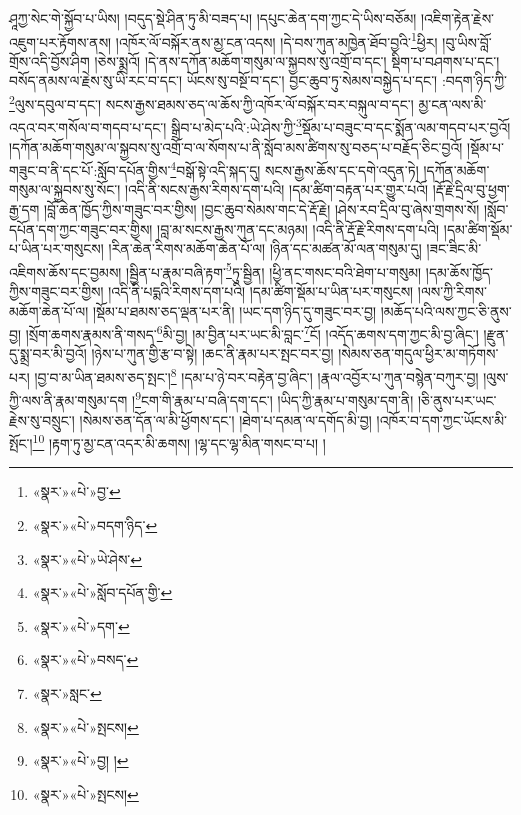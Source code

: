 ཤཱཀྱ་སེང་གེ་སྐྱོབ་པ་ཡིས། །བདུད་སྡེ་ཤིན་ཏུ་མི་བཟད་པ། །དཔུང་ཆེན་དག་ཀྱང་དེ་ཡིས་བཅོམ། །འཇིག་རྟེན་རྗེས་འཇུག་པར་རྟོགས་ནས། །འཁོར་ལོ་བསྐོར་ནས་མྱ་ངན་འདས། །དེ་བས་ཀུན་མཁྱེན་ཐོབ་བྱའི་\footnote{«སྣར་»«པེ་»བྱ་}ཕྱིར། །བུ་ཡིས་བློ་གྲོས་འདི་བྱོས་ཤིག །ཅེས་སྨྲའོ། །དེ་ནས་དཀོན་མཆོག་གསུམ་ལ་སྐྱབས་སུ་འགྲོ་བ་དང་། སྡིག་པ་བཤགས་པ་དང་། བསོད་ནམས་ལ་རྗེས་སུ་ཡི་རང་བ་དང་། ཡོངས་སུ་བསྔོ་བ་དང་། བྱང་ཆུབ་ཏུ་སེམས་བསྐྱེད་པ་དང་། :བདག་ཉིད་ཀྱི་\footnote{«སྣར་»«པེ་»བདག་ཉིད་}ལུས་དབུལ་བ་དང་། སངས་རྒྱས་ཐམས་ཅད་ལ་ཆོས་ཀྱི་འཁོར་ལོ་བསྐོར་བར་བསྐུལ་བ་དང་། མྱ་ངན་ལས་མི་འདའ་བར་གསོལ་བ་གདབ་པ་དང་། སྒྲིབ་པ་མེད་པའི་:ཡེ་ཤེས་ཀྱི་\footnote{«སྣར་»«པེ་»ཡེ་ཤེས་}སྡོམ་པ་བཟུང་བ་དང་སྨོན་ལམ་གདབ་པར་བྱའོ། །དཀོན་མཆོག་གསུམ་ལ་སྐྱབས་སུ་འགྲོ་བ་ལ་སོགས་པ་ནི་སློབ་མས་ཚིགས་སུ་བཅད་པ་བརྗོད་ཅིང་བྱའོ། །སྡོམ་པ་གཟུང་བ་ནི་དང་པོ་:སློབ་དཔོན་གྱིས་\footnote{«སྣར་»«པེ་»སློབ་དཔོན་གྱི་}བསྒོ་སྟེ་འདི་སྐད་དུ། སངས་རྒྱས་ཆོས་དང་དགེ་འདུན་ཏེ། །དཀོན་མཆོག་གསུམ་ལ་སྐྱབས་སུ་སོང་། །འདི་ནི་སངས་རྒྱས་རིགས་དག་པའི། །དམ་ཚིག་བརྟན་པར་གྱུར་པའོ། །རྡོ་རྗེ་དྲིལ་བུ་ཕྱག་རྒྱ་དག །བློ་ཆེན་ཁྱོད་ཀྱིས་གཟུང་བར་གྱིས། །བྱང་ཆུབ་སེམས་གང་དེ་རྡོ་རྗེ། །ཤེས་རབ་དྲིལ་བུ་ཞེས་གྲགས་སོ། །སློབ་དཔོན་དག་ཀྱང་གཟུང་བར་གྱིས། །བླ་མ་སངས་རྒྱས་ཀུན་དང་མཉམ། །འདི་ནི་རྡོ་རྗེ་རིགས་དག་པའི། །དམ་ཚིག་སྡོམ་པ་ཡིན་པར་གསུངས། །རིན་ཆེན་རིགས་མཆོག་ཆེན་པོ་ལ། །ཉིན་དང་མཚན་མོ་ལན་གསུམ་དུ། །ཟང་ཟིང་མི་འཇིགས་ཆོས་དང་བྱམས། །སྦྱིན་པ་རྣམ་བཞི་རྟག་\footnote{«སྣར་»«པེ་»དག་}ཏུ་སྦྱིན། །ཕྱི་ནང་གསང་བའི་ཐེག་པ་གསུམ། །དམ་ཆོས་ཁྱོད་ཀྱིས་གཟུང་བར་གྱིས། །འདི་ནི་པདྨའི་རིགས་དག་པའི། །དམ་ཚིག་སྡོམ་པ་ཡིན་པར་གསུངས། །ལས་ཀྱི་རིགས་མཆོག་ཆེན་པོ་ལ། །སྡོམ་པ་ཐམས་ཅད་ལྡན་པར་ནི། །ཡང་དག་ཉིད་དུ་གཟུང་བར་བྱ། །མཆོད་པའི་ལས་ཀྱང་ཅི་ནུས་བྱ། །སྲོག་ཆགས་རྣམས་ནི་གསད་\footnote{«སྣར་»«པེ་»བསད་}མི་བྱ། །མ་བྱིན་པར་ཡང་མི་བླང་\footnote{«སྣར་»སླང་}ངོ། །འདོད་ཆགས་དག་ཀྱང་མི་བྱ་ཞིང་། །རྫུན་དུ་སྨྲ་བར་མི་བྱའོ། །ཉེས་པ་ཀུན་གྱི་རྩ་བ་སྟེ། །ཆང་ནི་རྣམ་པར་སྤང་བར་བྱ། །སེམས་ཅན་གདུལ་ཕྱིར་མ་གཏོགས་པར། །བྱ་བ་མ་ཡིན་ཐམས་ཅད་སྤང་།\footnote{«སྣར་»«པེ་»སྤངས།} །དམ་པ་ཉེ་བར་བརྟེན་བྱ་ཞིང་། །རྣལ་འབྱོར་པ་ཀུན་བསྙེན་བཀུར་བྱ། །ལུས་ཀྱི་ལས་ནི་རྣམ་གསུམ་དག །\footnote{«སྣར་»«པེ་»བྱ། །}ངག་གི་རྣམ་པ་བཞི་དག་དང་། །ཡིད་ཀྱི་རྣམ་པ་གསུམ་དག་ནི། །ཅི་ནུས་པར་ཡང་རྗེས་སུ་བསྲུང་། །སེམས་ཅན་དོན་ལ་མི་ཕྱོགས་དང་། །ཐེག་པ་དམན་ལ་དགོད་མི་བྱ། །འཁོར་བ་དག་ཀྱང་ཡོངས་མི་སྤོང་།\footnote{«སྣར་»«པེ་»སྤངས།} །རྟག་ཏུ་མྱ་ངན་འདར་མི་ཆགས། །ལྷ་དང་ལྷ་མིན་གསང་བ་པ། །
